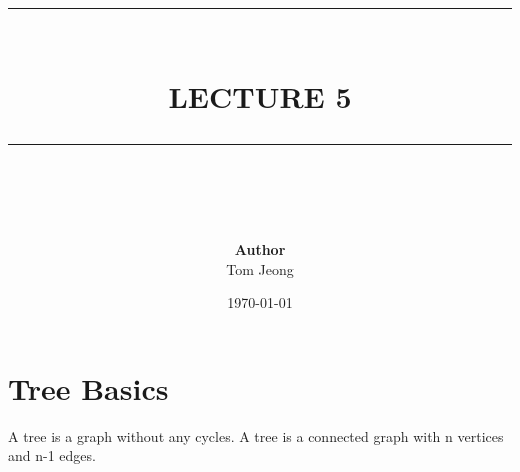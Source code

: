 \documentclass{article}
\newcommand{\HRule}[1]{\rule{\linewidth}{#1}}
\begin{document}

\title{ \normalsize \textsc{}
		\\ [2.0cm]
		\HRule{1.5pt} \\
		\LARGE \textbf{\uppercase{Lecture 5 }}
		\HRule{2.0pt} \\ [0.6cm] \LARGE{}
		}

\date{\today}
\author{\textbf{Author} \\ 
		Tom Jeong
        }

\maketitle
\newpage

\tableofcontents
\newpage


\section{Tree Basics}
A tree is a graph without any cycles. A tree is a connected graph with n vertices and n-1 edges.
\end{document}

